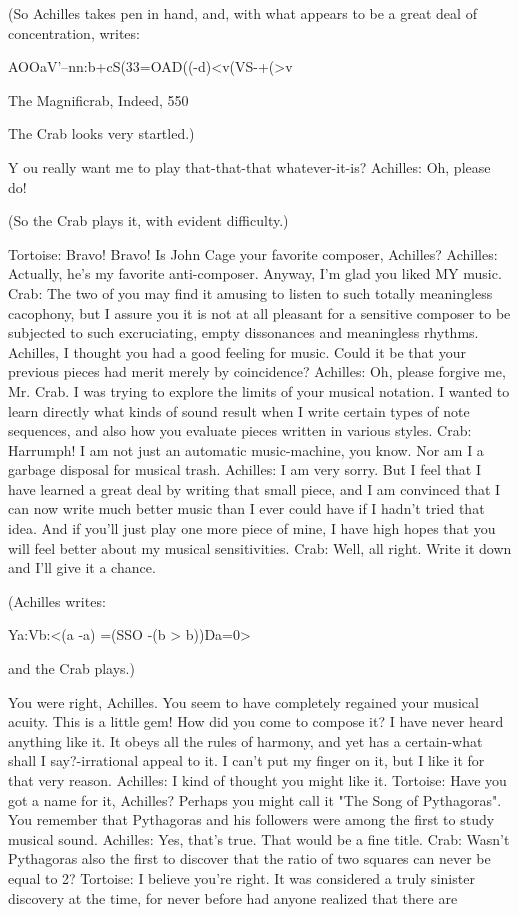 {       (So Achilles takes pen in hand, and, with what appears to be a great deal of
          concentration, writes:

                      AOOaV'\/--nn:b+cS(33=OAD((-d)<v(VS-+(>v




   The Magnificrab, Indeed,                                                                 550

   The Crab looks very startled.)

Y ou really want me to play that-that-that whatever-it-is?
Achilles: Oh, please do!

(So the Crab plays it, with evident difficulty.)

Tortoise: Bravo! Bravo! Is John Cage your favorite composer, Achilles? Achilles: Actually,
  he's my favorite anti-composer. Anyway, I'm glad you liked MY music.
Crab: The two of you may find it amusing to listen to such totally meaningless cacophony,
  but I assure you it is not at all pleasant for a sensitive composer to be subjected to such
  excruciating, empty dissonances and meaningless rhythms. Achilles, I thought you had a
  good feeling for music. Could it be that your previous pieces had merit merely by
  coincidence?
Achilles: Oh, please forgive me, Mr. Crab. I was trying to explore the limits of your musical
  notation. I wanted to learn directly what kinds of sound result when I write certain types
  of note sequences, and also how you evaluate pieces written in various styles.
Crab: Harrumph! I am not just an automatic music-machine, you know. Nor am I a garbage
  disposal for musical trash.
Achilles: I am very sorry. But I feel that I have learned a great deal by writing that small
  piece, and I am convinced that I can now write much better music than I ever could have
  if I hadn't tried that idea. And if you'll just play one more piece of mine, I have high
  hopes that you will feel better about my musical sensitivities.
Crab: Well, all right. Write it down and I'll give it a chance.

   (Achilles writes:

                       Ya:Vb:<(a -a) =(SSO -(b               > b))Da=0>

   and the Crab plays.)

  You were right, Achilles. You seem to have completely regained your musical acuity.
  This is a little gem! How did you come to compose it? I have never heard anything like it.
  It obeys all the rules of harmony, and yet has a certain-what shall I say?-irrational appeal
  to it. I can't put my finger on it, but I like it for that very reason.
Achilles: I kind of thought you might like it.
Tortoise: Have you got a name for it, Achilles? Perhaps you might call it "The Song of
  Pythagoras". You remember that Pythagoras and his followers were among the first to
  study musical sound.
Achilles: Yes, that's true. That would be a fine title.
Crab: Wasn't Pythagoras also the first to discover that the ratio of two squares can never be
  equal to 2? Tortoise: I believe you're right. It was considered a truly sinister discovery at
  the time, for never before had anyone realized that there are




}
